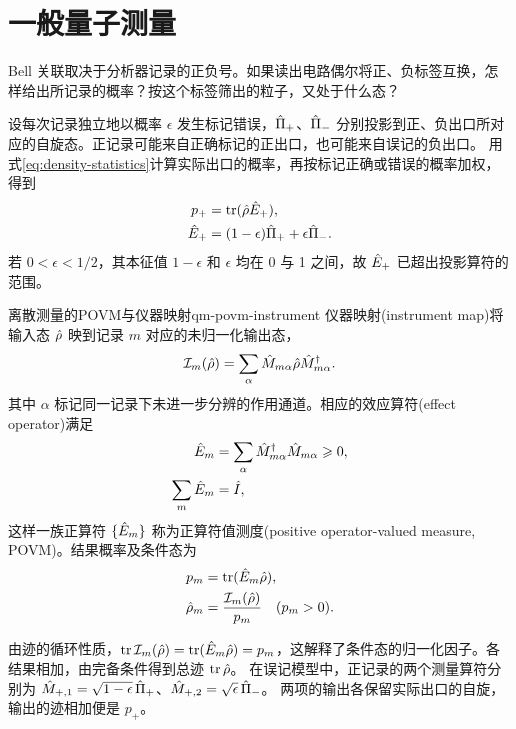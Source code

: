 \section{一般量子测量}
\label{sec:povm}
Bell 关联取决于分析器记录的正负号。如果读出电路偶尔将正、负标签互换，怎样给出所记录的概率？按这个标签筛出的粒子，又处于什么态？

设每次记录独立地以概率 $\epsilon$ 发生标记错误，$\hat{\Pi}_+$、$\hat{\Pi}_-$ 分别投影到正、负出口所对应的自旋态。正记录可能来自正确标记的正出口，也可能来自误记的负出口。
用式\eqref{eq:density-statistics}计算实际出口的概率，再按标记正确或错误的概率加权，得到
\begin{subequations}
    \begin{align}
        p_+ &= \operatorname{tr}(\hat{\rho}\hat{E}_+),\\
        \hat{E}_+ &= (1 - \epsilon)\hat{\Pi}_+ + \epsilon\hat{\Pi}_- .
    \end{align}
\end{subequations}
若 $0 < \epsilon < 1/2$，其本征值 $1 - \epsilon$ 和 $\epsilon$ 均在 0 与 1 之间，故 $\hat{E}_+$ 已超出投影算符的范围。

\begin{definition}{离散测量的POVM与仪器映射}{qm-povm-instrument}
    仪器映射(instrument map)将输入态 $\hat{\rho}$ 映到记录 $m$ 对应的未归一化输出态，
    \begin{equation}\label{eq:qm-measurement-instrument}
        \mathcal I_m(\hat{\rho}) = \sum_\alpha \hat{M}_{m\alpha}\hat{\rho} \hat{M}_{m\alpha}^\dagger .
    \end{equation}
    其中 $\alpha$ 标记同一记录下未进一步分辨的作用通道。相应的效应算符(effect operator)满足
    \begin{subequations}
        \begin{align}
            \hat{E}_m &= \sum_\alpha \hat{M}_{m\alpha}^\dagger \hat{M}_{m\alpha} \geqslant 0,\\
            \sum_m\hat{E}_m &= \hat{I},
        \end{align}
    \end{subequations}
    这样一族正算符 $\{\hat{E}_m\}$ 称为正算符值测度(positive operator-valued measure, POVM)。结果概率及条件态为
    \begin{subequations}
        \begin{align}
            p_m &= \operatorname{tr}(\hat{E}_m\hat{\rho}),\\
            \hat{\rho}_m &= \frac{\mathcal I_m(\hat{\rho})}{p_m}
            \quad(p_m > 0).
        \end{align}
    \end{subequations}
\end{definition}
由迹的循环性质，$\operatorname{tr}\mathcal I_m(\hat{\rho}) = \operatorname{tr}(\hat{E}_m\hat{\rho}) = p_m$，这解释了条件态的归一化因子。各结果相加，由完备条件得到总迹 $\operatorname{tr}\hat{\rho}$。
在误记模型中，正记录的两个测量算符分别为 $\hat{M}_{+,1} = \sqrt{1 - \epsilon}\,\hat{\Pi}_+$、$\hat{M}_{+,2} = \sqrt{\epsilon}\,\hat{\Pi}_-$。
两项的输出各保留实际出口的自旋，输出的迹相加便是 $p_+$。

